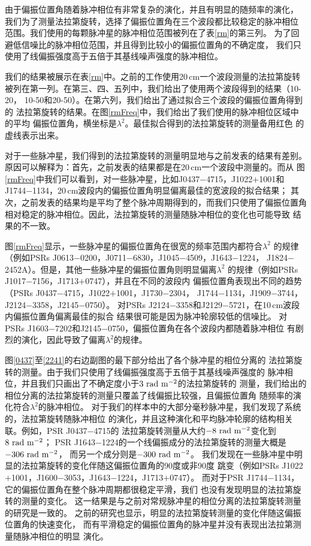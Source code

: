 由于偏振位置角随着脉冲相位有非常复杂的演化，并且有明显的随频率的演化，
我们为了测量法拉第旋转，选择了偏振位置角在三个波段都比较稳定的脉冲相位
范围。我们使用的每颗脉冲星的脉冲相位范围被列在了表\ref{rm}的第三列。
为了回避低信噪比的脉冲相位范围，并且得到比较小的偏振位置角的不确定度，
我们只使用了线偏振强度高于五倍于其基线噪声强度的脉冲相位。

我们的结果被展示在表\ref{rm}中。之前的工作使用20\,cm一个波段测量的法拉第旋转
被列在第一列。在第三、四、五列中，我们给出了使用两个波段得到的结果（10-20，
10-50和20-50）。在第六列，我们给出了通过拟合三个波段的偏振位置角得到的
法拉第旋转的结果。在图\ref{rmFreq}中，我们给出了我们使用的脉冲相位区域中的平均
偏振位置角，横坐标是$\lambda^2$。最佳拟合得到的法拉第旋转的测量备用红色
的虚线表示出来。

对于一些脉冲星，我们得到的法拉第旋转的测量明显地与之前发表的结果有差别。
原因可以解释为：首先，之前发表的结果都是在20\,cm一个波段中测量的。而从
图\ref{rmFreq}中我们可以看到，对一些脉冲星，比如J0437$-$4715，J1022$+$1001和
J1744$-$1134，20\,cm波段内的偏振位置角明显偏离最佳的宽波段的拟合结果；
其次，之前发表的结果均是平均了整个脉冲周期得到的，而我们只使用了偏振位置角
相对稳定的脉冲相位。因此，法拉第旋转的测量随脉冲相位的变化也可能导致
结果的不一致。

图\ref{rmFreq}显示，一些脉冲星的偏振位置角在很宽的频率范围内都符合$\lambda^2$
的规律（例如PSRs J0613$-$0200，J0711$-$6830，J1045$-$4509，J1643$-$1224，
J1824$-$2452A）。但是，其他一些脉冲星的偏振位置角则明显偏离$\lambda^2$
的规律（例如PSRs J1017$-$7156，J1713$+$0747），并且在不同的波段内
偏振位置角表现出不同的趋势（PSRs J0437$-$4715，J1022$+$1001，J1730$-$2304，
J1744$-$1134，J1909$-$3744，J2124$-$3358，J2145$-$0750）。
%
对PSRs J2124$-$3358和J2129$-$5721，在10\,cm波段内偏振位置角偏离最佳的拟合
结果很可能是因为脉冲轮廓较低的信噪比。 
%
对PSRs J1603$-$7202和J2145$-$0750，偏振位置角在各个波段内都随着脉冲相位
有剧烈的演化，因此导致了偏离$\lambda^2$的规律。

图\ref{0437}至\ref{2241}的右边副图的最下部分给出了各个脉冲星的相位分离的
法拉第旋转的测量。由于我们只使用了线偏振强度高于五倍于其基线噪声强度的
脉冲相位，并且我们只画出了不确定度小于$3\ \rm{rad\ m^{-2}}$的法拉第旋转的
测量，我们给出的相位分离的法拉第旋转的测量只覆盖了线偏振比较强，且偏振位置角
随频率的演化符合$\lambda^2$的脉冲相位。
%
对于我们的样本中的大部分毫秒脉冲星，我们发现了系统的，法拉第旋转随脉冲相位
的演化，并且这种演化和平均脉冲轮廓的结构相关联。例如，PSR J0437$-$4715的
法拉第旋转测量从大约$-8\ \rm{rad\ m^{-2}}$变化到$8\ \rm{rad\ m^{-2}}$；
PSR J1643$-$1224的一个线偏振成分的法拉第旋转的测量大概是$-306\ \rm{rad\ m^{-2}}$，
而另一个成分则是$-300\ \rm{rad\ m^{-2}}$。
%
我们发现在一些脉冲星中明显的法拉第旋转的变化伴随这偏振位置角的90度或非90度
跳变（例如PSRs J1022$+$1001，J1600$-$3053，J1643$-$1224，J1713$+$0747）。
而对于PSR J1744$-$1134，它的偏振位置角在整个脉冲周期都很稳定平滑，我们
也没有发现明显的法拉第旋转的测量的变化。
%
这一结果是与之前对常规脉冲星的相位分离的法拉第旋转测量的研究是一致的。
之前的研究也显示，明显的法拉第旋转测量的变化伴随这偏振位置角的快速变化，
而有平滑稳定的偏振位置角的脉冲星并没有表现出法拉第测量随脉冲相位的明显
演化\supercite{Noutsos09}。

